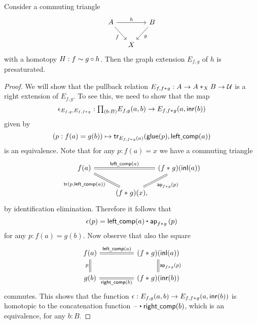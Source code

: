 \begin{lem}\label{thm:pb_presat}
Consider a commuting triangle
\begin{equation*}
\begin{tikzcd}[column sep=small]
A \arrow[rr,"h"] \arrow[dr,swap,"f"] & & B \arrow[dl,"g"] \\
& X
\end{tikzcd}
\end{equation*}
with a homotopy $H:f\htpy g\circ h$. Then the graph extension $E_{f,g}$ of $h$ is presaturated.
\end{lem}

\begin{proof}
We will show that the pullback relation $E_{f,\join{f}{g}}:A\to \join[X]{A}{B}\to\UU$ is a right extension of $E_{f,g}$. 
To see this, we need to show that the map
\begin{equation*}
\epsilon_{E_{f,g},E_{f,\join{f}{g}}} : \prd{b:B} E_{f,g}(a,b)\to E_{f,\join{f}{g}}(a,\inr(b))
\end{equation*}
given by
\begin{equation*}
(p:f(a)=g(b))\mapsto \mathsf{tr}_{E_{f,\join{f}{g}}(a)}(\glue(p),\mathsf{left\usc{}comp}(a))
\end{equation*}
is an equivalence. Note that for any $p:f(a)=x$ we have a commuting triangle
\begin{equation*}
\begin{tikzcd}[column sep=tiny]
f(a) \arrow[rr,equals,"\mathsf{left\usc{}comp}(a)"] \arrow[dr,equals,swap,"{\mathsf{tr}(p,\mathsf{left\usc{}comp}(a))}"] & & (\join{f}{g})(\inl(a)) \arrow[dl,equals,"\ap{\join{f}{g}}{p}"] \\
\phantom{(\join{f}{g})(\inl(a))} & (\join{f}{g})(x),
\end{tikzcd}
\end{equation*}
by identification elimination. Therefore it follows that
\begin{equation*}
\epsilon(p)= \ct{\mathsf{left\usc{}comp}(a)}{\ap{\join{f}{g}}{p}}
\end{equation*}
for any $p:f(a)=g(b)$. Now observe that also the square
\begin{equation*}
\begin{tikzcd}[column sep=huge]
f(a) \arrow[r,equals,"\mathsf{left\usc{}comp}(a)"] \arrow[d,equals,swap,"p"] & (\join{f}{g})(\inl(a)) \arrow[d,equals,"\ap{\join{f}{g}}{p}"] \\
g(b) \arrow[r,equals,swap,"\mathsf{right\usc{}comp}(b)"] & (\join{f}{g})(\inr(b))
\end{tikzcd}
\end{equation*}
commutes. This shows that the function $\epsilon:E_{f,g}(a,b)\to E_{f,\join{f}{g}}(a,\inr(b))$ is homotopic to the concatenation function $\ct{\blank}{\mathsf{right\usc{}comp}(b)}$, which is an equivalence, for any $b:B$.
\end{proof}

